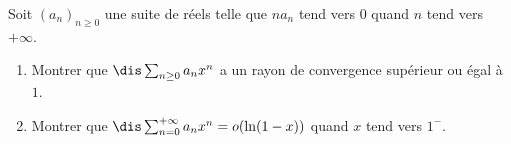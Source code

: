 \documentclass[a4paper,10pt]{report}
\begin{document}

\begin{Exa}[\ding{80}] Soit $(a_n)_{n \geq 0}$ une suite de réels telle que $na_n$ tend vers $0$ quand $n$ tend vers $+ \infty$.
\begin{enumerate}
\item Montrer que $\dis \sum_{n \geq 0} a_n x^n$ a un rayon de convergence supérieur ou égal à $1$.
\item Montrer que $\dis \sum_{n=0}^{+ \infty} a_n x^n = o(\ln(1-x))$ quand $x$ tend vers $1^{-}$.
\end{enumerate}
\end{Exa}
\end{document}
